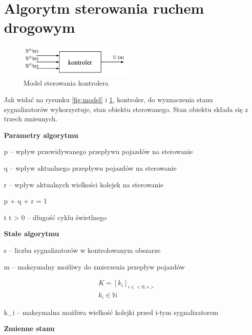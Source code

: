 \section{Algorytm sterowania ruchem drogowym}
\begin{figure}[h]
    \centering
    \includegraphics[width=0.5\textwidth]{images/kontroler.pdf}
    \caption{Model sterowania kontrolera}
    \label{fig:kontroler}
\end{figure}

Jak widać na rysunku \ref{fig:model} i \ref{fig:kontroler}, kontroler, do wyznaczenia stanu sygnalizatorów wykorzystuje, stan obiektu sterowanego. Stan obiektu składa się z trzech zmiennych.

\vspace{1.5cm}
\textbf{Parametry algorytmu}

p  \textrm{ -- wpływ przewidywanego przepływu pojazdów na sterowanie}

q  \textrm{ -- wpływ aktualnego przepływu pojazdów na sterowanie}

r  \textrm{ -- wpływ aktualnych wielkości kolejek na sterowanie}

p + q + r = 1

t \in {} \textrm{ } t > 0 \textrm{ -- długość cyklu świetlnego}

\vspace{1.5cm}
\textbf{Stałe algorytmu}

s \in {} \textrm{ -- liczba sygnalizatorów w kontrolowanym obszarze}

m \in {} \textrm{ -- maksymalny możliwy do zmierzenia przepływ pojazdów}

\begin{equation}
	\begin{array}{c}
		K = \left[ k_{i} \right]_{i \in <0,s>}\\
		k_{i} \in \mathbb{N}
	\end{array}
\end{equation}

k_{i} \textrm{ -- maksymalna możliwa wielkość kolejki przed i-tym sygnalizatorem}

\vspace{1.5cm}
\textbf{Zmienne stanu}

